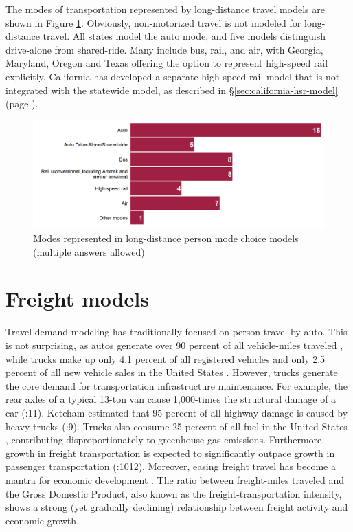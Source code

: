 The modes of transportation represented by long-distance travel models are shown in Figure \ref{fig:person-long-distance-modes}. Obviously, non-motorized travel is not modeled for long-distance travel. All states model the auto mode, and five models distinguish drive-alone from shared-ride. Many include bus, rail, and air, with Georgia, Maryland, Oregon and Texas offering the option to represent high-speed rail explicitly. California has developed a separate high-speed rail model that is not integrated with the statewide model, as described in \S\ref{sec:california-hsr-model} (page \pageref{sec:california-hsr-model}).

\begin{figure}   %
\centering
\includegraphics[width=6.4in]{graphics/21-person-long-distance-modes}
\caption[Modes represented in long-distance person mode choice models]{Modes represented in long-distance person mode choice models (multiple answers allowed)}
\label{fig:person-long-distance-modes}
\end{figure}

\section{ Freight models}

Travel demand modeling has traditionally focused on person travel by auto. This is not surprising, as autos generate over 90 percent of all vehicle-miles traveled \citep{fhwa16b}, while trucks make up only 4.1 percent of all registered vehicles and only 2.5 percent of all new vehicle sales in the United States \citep{bea16}. However, trucks generate the core demand for transportation infrastructure maintenance. For example, the rear axles of a typical 13-ton van cause 1,000-times the structural damage of a car (\cite{small89}:11). Ketcham estimated that 95 percent of all highway damage is caused by heavy trucks (\cite{mackenzie92}:9). Trucks also consume 25 percent of all fuel in the United States \citep{bts16}, contributing disproportionately to greenhouse gas emissions. Furthermore, growth in freight transportation is expected to significantly outpace growth in passenger transportation (\cite{chow10}:1012). Moreover, easing freight travel has become a mantra for economic development \citep{mckinnon06}. The ratio between freight-miles traveled and the Gross Domestic Product, also known as the freight-transportation intensity, shows a strong (yet gradually declining) relationship between freight activity and economic growth.

